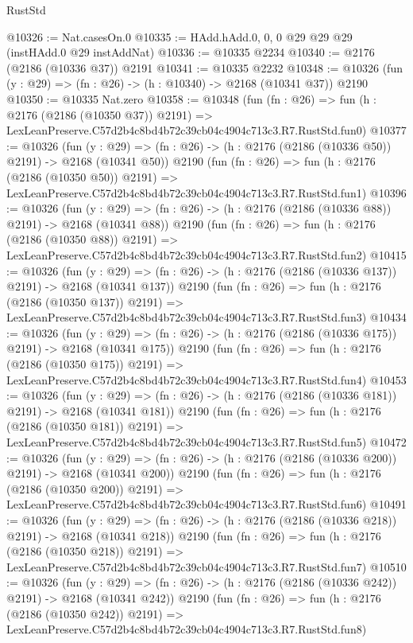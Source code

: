 \begin{lexlean}{RustStd}
\begin{coremodule}
@10326 := Nat.casesOn.{0}
@10335 := HAdd.hAdd.{0, 0, 0} @29 @29 @29 (instHAdd.{0} @29 instAddNat)
@10336 := @10335 @2234
@10340 := @2176 (@2186 (@10336 @37)) @2191
@10341 := @10335 @2232
@10348 := @10326 (fun (y : @29) => (fn : @26) -> (h : @10340) -> @2168 (@10341 @37)) @2190
@10350 := @10335 Nat.zero
@10358 := @10348
    (fun (fn : @26) =>
    fun (h : @2176 (@2186 (@10350 @37)) @2191) =>
    LexLeanPreserve.C57d2b4c8bd4b72c39cb04c4904c713c3.R7.RustStd.fun0)
@10377 := @10326
    (fun (y : @29) => (fn : @26) -> (h : @2176 (@2186 (@10336 @50)) @2191) -> @2168 (@10341 @50))
    @2190
    (fun (fn : @26) =>
    fun (h : @2176 (@2186 (@10350 @50)) @2191) =>
    LexLeanPreserve.C57d2b4c8bd4b72c39cb04c4904c713c3.R7.RustStd.fun1)
@10396 := @10326
    (fun (y : @29) => (fn : @26) -> (h : @2176 (@2186 (@10336 @88)) @2191) -> @2168 (@10341 @88))
    @2190
    (fun (fn : @26) =>
    fun (h : @2176 (@2186 (@10350 @88)) @2191) =>
    LexLeanPreserve.C57d2b4c8bd4b72c39cb04c4904c713c3.R7.RustStd.fun2)
@10415 := @10326
    (fun (y : @29) => (fn : @26) -> (h : @2176 (@2186 (@10336 @137)) @2191) -> @2168 (@10341 @137))
    @2190
    (fun (fn : @26) =>
    fun (h : @2176 (@2186 (@10350 @137)) @2191) =>
    LexLeanPreserve.C57d2b4c8bd4b72c39cb04c4904c713c3.R7.RustStd.fun3)
@10434 := @10326
    (fun (y : @29) => (fn : @26) -> (h : @2176 (@2186 (@10336 @175)) @2191) -> @2168 (@10341 @175))
    @2190
    (fun (fn : @26) =>
    fun (h : @2176 (@2186 (@10350 @175)) @2191) =>
    LexLeanPreserve.C57d2b4c8bd4b72c39cb04c4904c713c3.R7.RustStd.fun4)
@10453 := @10326
    (fun (y : @29) => (fn : @26) -> (h : @2176 (@2186 (@10336 @181)) @2191) -> @2168 (@10341 @181))
    @2190
    (fun (fn : @26) =>
    fun (h : @2176 (@2186 (@10350 @181)) @2191) =>
    LexLeanPreserve.C57d2b4c8bd4b72c39cb04c4904c713c3.R7.RustStd.fun5)
@10472 := @10326
    (fun (y : @29) => (fn : @26) -> (h : @2176 (@2186 (@10336 @200)) @2191) -> @2168 (@10341 @200))
    @2190
    (fun (fn : @26) =>
    fun (h : @2176 (@2186 (@10350 @200)) @2191) =>
    LexLeanPreserve.C57d2b4c8bd4b72c39cb04c4904c713c3.R7.RustStd.fun6)
@10491 := @10326
    (fun (y : @29) => (fn : @26) -> (h : @2176 (@2186 (@10336 @218)) @2191) -> @2168 (@10341 @218))
    @2190
    (fun (fn : @26) =>
    fun (h : @2176 (@2186 (@10350 @218)) @2191) =>
    LexLeanPreserve.C57d2b4c8bd4b72c39cb04c4904c713c3.R7.RustStd.fun7)
@10510 := @10326
    (fun (y : @29) => (fn : @26) -> (h : @2176 (@2186 (@10336 @242)) @2191) -> @2168 (@10341 @242))
    @2190
    (fun (fn : @26) =>
    fun (h : @2176 (@2186 (@10350 @242)) @2191) =>
    LexLeanPreserve.C57d2b4c8bd4b72c39cb04c4904c713c3.R7.RustStd.fun8)

\end{coremodule}
\end{lexlean}
